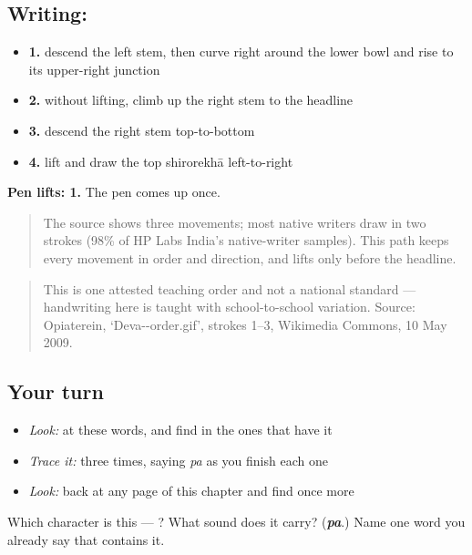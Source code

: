 \subsection*{Writing: }

\begin{itemize}
\raggedright
  \item \textbf{1.} descend the left stem, then curve right around the lower bowl and rise to its upper-right junction
  \item \textbf{2.} without lifting, climb up the right stem to the headline
  \item \textbf{3.} descend the right stem top-to-bottom
  \item \textbf{4.} lift and draw the top shirorekhā left-to-right
\end{itemize}

\textbf{Pen lifts: 1.} The pen comes up once.

\begin{quote}
The source shows three movements; most native writers draw  in two strokes (98\% of HP Labs India's native-writer samples). This path keeps every movement in order and direction, and lifts only before the headline.
\end{quote}

\begin{quote}
This is one attested teaching order and not a national standard — handwriting here is taught with school-to-school variation. Source: Opiaterein, ‘Deva--order.gif’, strokes 1–3, Wikimedia Commons, 10 May 2009.
\end{quote}

\subsection*{Your turn}
\begin{itemize}
\raggedright
  \item \emph{Look:} at these words, and find  in the ones that have it
\end{itemize}

\begin{quote}
\end{quote}

\begin{itemize}
\raggedright
  \item \emph{Trace it:}  three times, saying \emph{pa} as you finish each one
  \item \emph{Look:} back at any page of this chapter and find  once more
\end{itemize}

\begin{tcolorbox}[breakable,colback=teal!4,colframe=teal!35!black,title={Before you move on}]
Which character is this — ? What sound does it carry? (\emph{\textbf{pa}}.) Name one word you already say that contains it.
\end{tcolorbox}
